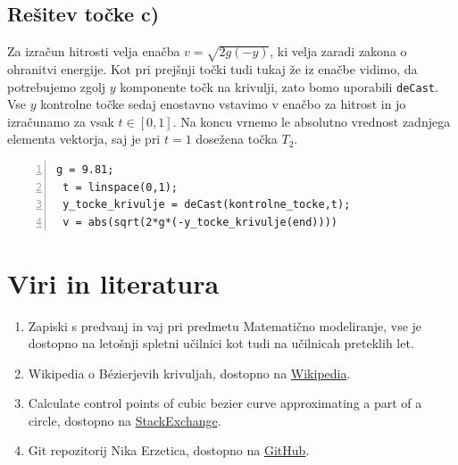 \documentclass[a4paper,12pt]{article}
\begin{document}
	\subsection{Rešitev točke c)}
	
	Za izračun hitrosti velja enačba $v = \sqrt{2g(-y)}$, ki velja zaradi zakona o ohranitvi energije. 
	Kot pri prejšnji točki tudi tukaj že iz enačbe vidimo, da potrebujemo zgolj $y$ komponente točk na krivulji, zato bomo
	uporabili \lstinline[style=Matlab-editor]!deCast!. Vse $y$ kontrolne točke sedaj enostavno vstavimo v enačbo za hitrost in
	jo izračunamo za vsak $t \in [0,1]$. Na koncu vrnemo le absolutno vrednost zadnjega elementa vektorja, saj je pri $t = 1$ dosežena točka $T_2$.

	\begin{lstlisting}[style=Matlab-editor,	numbers=left,]
 g = 9.81;
 t = linspace(0,1);
 y_tocke_krivulje = deCast(kontrolne_tocke,t);
 v = abs(sqrt(2*g*(-y_tocke_krivulje(end))))
	\end{lstlisting}
	

	\section{Viri in literatura}
	
	\begin{enumerate}[label=\textbullet]
		\item Zapiski s predvanj in vaj pri predmetu Matematično modeliranje, vse je dostopno na letošnji spletni učilnici kot tudi na učilnicah preteklih let.
		\item Wikipedia o B\'{e}zierjevih krivuljah, dostopno na \href{https://sl.wikipedia.org/wiki/Bézierova_krivulja}{Wikipedia}.
		\item Calculate control points of cubic bezier curve approximating a part of a circle, dostopno na \href{https://math.stackexchange.com/questions/873224/calculate-control-points-of-cubic-bezier-curve-approximating-a-part-of-a-circle}{StackExchange}.
		\item Git repozitorij Nika Erzetica, dostopno na \href{https://github.com/nikerzetic/matematicno-modeliranje}{GitHub}.
	\end{enumerate}
	
\end{document}
